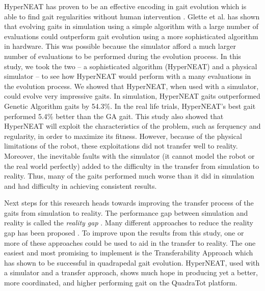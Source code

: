 HyperNEAT has proven to be an effective encoding in gait evolution which is able to find gait regularities without human intervention \cite{clune1,clune2,yos:clune}. 
Glette et al. \cite{glette} has shown that evolving gaits in simulation using a simple algorithm with a large number of evaluations could outperform gait evolution using a more sophisticated algorithm in hardware.  
This was possible because the simulator afford a much larger number of evaluations to be performed during the evolution process. 
In this study, we took the two -- a sophisticated algorithm (HyperNEAT) and a physical simulator -- to see how HyperNEAT would perform with a many evaluations in the evolution process. 
We showed that HyperNEAT, when used with a simulator, could evolve very impressive gaits. 
In simulation, HyperNEAT gaits outperformed Genetic Algorithm gaits \cite{glette} by 54.3\%. 
In the real life trials, HyperNEAT's best gait performed 5.4\% better than the GA gait. 
This study also showed that HyperNEAT will exploit the characteristics of the problem, such as ferquency and regularity, in order to maximize its fitness.
However, because of the physical limitations of the robot, these exploitations did not transfer well to reality. %
Moreover, the inevitable faults with the simulator (it cannot model the robot or the real world perfectly) added to the difficulty in the transfer from simulation to reality. 
Thus, many of the gaits performed much worse than it did in simulation and had difficulty in achieving consistent results. 


Next steps for this research heads towards improving the transfer process of the gaits from simulation to reality. 
The performance gap between simulation and reality is called the \emph{reality gap} \cite{jakobi}. 
Many different approaches to reduce the reality gap has been proposed \cite{koos1,bongard,zagal}. 
To improve upon the results from this study, one or more of these approaches could be used to aid in the transfer to reality. 
The one easiest and most promising to implement is the Transferability Approach \cite{koos2} which has shown to be successful in quadrapedal gait evolution. 
HyperNEAT, used with a simulator and a transfer approach, shows much hope in producing yet a better, more coordinated, and higher performing gait on the QuadraTot platform. 
